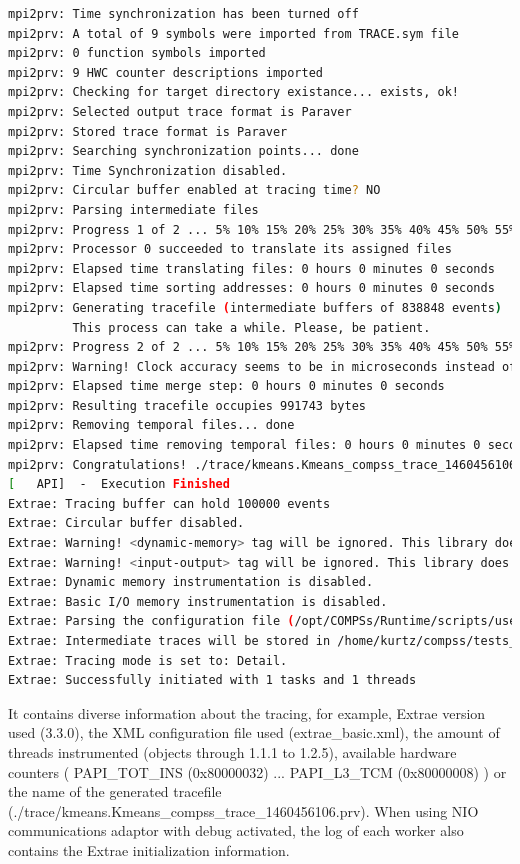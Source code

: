\begin{lstlisting}[language=bash]
mpi2prv: Time synchronization has been turned off
mpi2prv: A total of 9 symbols were imported from TRACE.sym file
mpi2prv: 0 function symbols imported
mpi2prv: 9 HWC counter descriptions imported
mpi2prv: Checking for target directory existance... exists, ok!
mpi2prv: Selected output trace format is Paraver
mpi2prv: Stored trace format is Paraver
mpi2prv: Searching synchronization points... done
mpi2prv: Time Synchronization disabled.
mpi2prv: Circular buffer enabled at tracing time? NO
mpi2prv: Parsing intermediate files
mpi2prv: Progress 1 of 2 ... 5% 10% 15% 20% 25% 30% 35% 40% 45% 50% 55% 60% 65% 70% 75% 80% 85% 90% 95% done
mpi2prv: Processor 0 succeeded to translate its assigned files
mpi2prv: Elapsed time translating files: 0 hours 0 minutes 0 seconds
mpi2prv: Elapsed time sorting addresses: 0 hours 0 minutes 0 seconds
mpi2prv: Generating tracefile (intermediate buffers of 838848 events)
         This process can take a while. Please, be patient.
mpi2prv: Progress 2 of 2 ... 5% 10% 15% 20% 25% 30% 35% 40% 45% 50% 55% 60% 65% 70% 75% 80% 85% 90% 95% done
mpi2prv: Warning! Clock accuracy seems to be in microseconds instead of nanoseconds.
mpi2prv: Elapsed time merge step: 0 hours 0 minutes 0 seconds
mpi2prv: Resulting tracefile occupies 991743 bytes
mpi2prv: Removing temporal files... done
mpi2prv: Elapsed time removing temporal files: 0 hours 0 minutes 0 seconds
mpi2prv: Congratulations! ./trace/kmeans.Kmeans_compss_trace_1460456106.prv has been generated.
[   API]  -  Execution Finished
Extrae: Tracing buffer can hold 100000 events
Extrae: Circular buffer disabled.
Extrae: Warning! <dynamic-memory> tag will be ignored. This library does support instrumenting dynamic memory calls.
Extrae: Warning! <input-output> tag will be ignored. This library does support instrumenting I/O calls.
Extrae: Dynamic memory instrumentation is disabled.
Extrae: Basic I/O memory instrumentation is disabled.
Extrae: Parsing the configuration file (/opt/COMPSs/Runtime/scripts/user/../../configuration/xml/tracing/extrae_basic.xml) has ended
Extrae: Intermediate traces will be stored in /home/kurtz/compss/tests_local/app10
Extrae: Tracing mode is set to: Detail.
Extrae: Successfully initiated with 1 tasks and 1 threads

\end{lstlisting}

It contains diverse information about the tracing, for example, Extrae version used (3.3.0), the XML configuration file used (extrae\_basic.xml), the amount of 
threads instrumented (objects through 1.1.1 to 1.2.5), available hardware counters ( PAPI\_TOT\_INS (0x80000032) ... PAPI\_L3\_TCM (0x80000008) ) or the name 
of the generated tracefile (./trace/kmeans.Kmeans\_compss\_trace\_1460456106.prv). When using NIO communications adaptor with debug activated, the log of each worker
also contains the Extrae initialization information.

